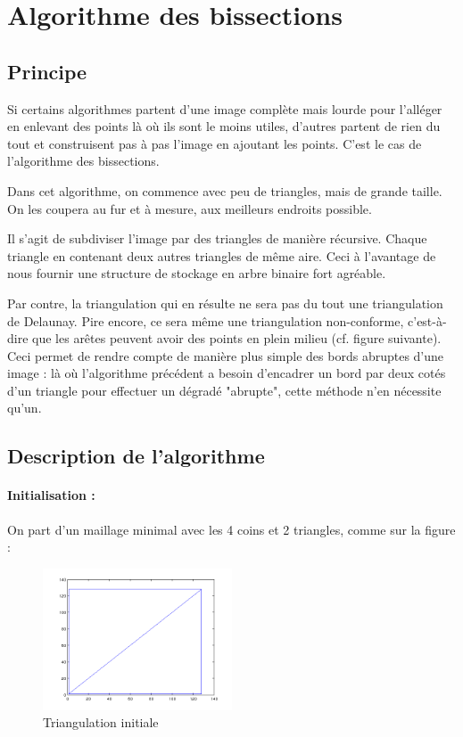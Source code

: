 \documentclass{report}
\begin{document}
\section{Algorithme des bissections}

\subsection{Principe}

Si certains algorithmes partent d'une image complète mais lourde pour l'alléger en enlevant des points là où ils sont le moins utiles, d'autres partent de rien du tout et construisent pas à pas l'image en ajoutant les points. C'est le cas de l'algorithme des bissections.

Dans cet algorithme, on commence avec peu de triangles, mais de grande taille. On les coupera au fur et à mesure, aux meilleurs endroits possible.

Il s'agit de subdiviser l'image par des triangles de manière récursive. Chaque triangle en contenant deux autres triangles de même aire. Ceci à l'avantage de nous fournir une structure de stockage en arbre binaire fort agréable. 

Par contre, la triangulation qui en résulte ne sera pas du tout une triangulation de Delaunay. Pire encore, ce sera même une triangulation non-conforme, c'est-à-dire que les arêtes peuvent avoir des points en plein milieu (cf. figure suivante). Ceci permet de rendre compte de manière plus simple des bords abruptes d'une image : là où l'algorithme précédent a besoin d'encadrer un bord par deux cotés d'un triangle pour effectuer un dégradé "abrupte", cette méthode n'en nécessite qu'un.

\subsection{Description de l'algorithme}

\paragraph{Initialisation :}

On part d'un maillage minimal avec les 4 coins et 2 triangles, comme sur la figure :

\begin{figure}[ht]
\centering
\includegraphics[width=0.5\textwidth]{beginBissect.png}
\caption{Triangulation initiale}
\end{figure}
\end{document}

